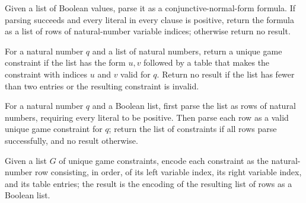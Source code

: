 \begin{definition}
\label{BooleanAnalysis.GaussianSpace.UniqueGames.parseNatRows}
\leanok
{}
Given a list of Boolean values, parse it as a conjunctive-normal-form formula. If
parsing succeeds and every literal in every clause is positive, return the formula as a
list of rows of natural-number variable indices; otherwise return no result.
\end{definition}

\begin{definition}
\label{BooleanAnalysis.GaussianSpace.UniqueGames.parseUniqueGameConstraint}
\leanok
{}
For a natural number $q$ and a list of natural numbers, return a unique game constraint
if the list has the form $u,v$ followed by a table that makes the constraint with
indices $u$ and $v$ valid for $q$. Return no result if the list has fewer than two
entries or the resulting constraint is invalid.
\end{definition}

\begin{definition}
\label{BooleanAnalysis.GaussianSpace.UniqueGames.parseUniqueGame}
\leanok
{}
For a natural number $q$ and a Boolean list, first parse the list as rows of natural
numbers, requiring every literal to be positive. Then parse each row as a valid unique
game constraint for $q$; return the list of constraints if all rows parse successfully,
and no result otherwise.
\end{definition}

\begin{definition}
\label{BooleanAnalysis.GaussianSpace.UniqueGames.encodeUniqueGame}
\leanok
{}
Given a list $G$ of unique game constraints, encode each constraint as the
natural-number row consisting, in order, of its left variable index, its right variable
index, and its table entries; the result is the encoding of the resulting list of rows
as a Boolean list.
\end{definition}

